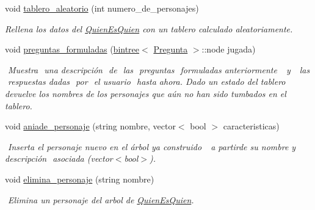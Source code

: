 \begin{DoxyCompactItemize}
\item 
void \hyperlink{classQuienEsQuien_ac0763b7ac0c24a3c54c2affaabe1f017}{tablero\+\_\+aleatorio} (int numero\+\_\+de\+\_\+personajes)
\begin{DoxyCompactList}\small\item\em Rellena los datos del \hyperlink{classQuienEsQuien}{Quien\+Es\+Quien} con un tablero calculado aleatoriamente. \end{DoxyCompactList}\item 
void \hyperlink{classQuienEsQuien_adcb666b01429a92009d1991bb07379e1}{preguntas\+\_\+formuladas} (\hyperlink{classbintree}{bintree}$<$ \hyperlink{classPregunta}{Pregunta} $>$\+::node jugada)
\begin{DoxyCompactList}\small\item\em ​ Muestra ​ una descripción​ ​ de​ ​ las​ ​ preguntas​ ​ formuladas​ ​ anteriormente ​ ​ y ​ ​ las​ ​ respuestas​ dadas​ ​ por​ ​ el​ usuario​ ​ hasta​ ​ ahora. Dado un estado del tablero devuelve los nombres de los personajes que aún no han sido tumbados en el tablero. \end{DoxyCompactList}\item 
void \hyperlink{classQuienEsQuien_ab2ded22e1d06ccb7c608ea1d7e3061d7}{aniade\+\_\+personaje} (string nombre, vector$<$ bool $>$ caracteristicas)
\begin{DoxyCompactList}\small\item\em ​ Inserta​ ​el​ personaje​ ​nuevo​ en​ el​ árbol​ ya construido ​ ​ a partir​​ de​ su​ ​nombre​ y ​descripción​ ​ asociada​ ​ (vector$<$bool$>$). \end{DoxyCompactList}\item 
void \hyperlink{classQuienEsQuien_ada5ff48eb2a12ddd07f11a01d2324982}{elimina\+\_\+personaje} (string nombre)
\begin{DoxyCompactList}\small\item\em ​ Elimina un personaje del arbol de \hyperlink{classQuienEsQuien}{Quien\+Es\+Quien}. \end{DoxyCompactList}\end{DoxyCompactItemize}
